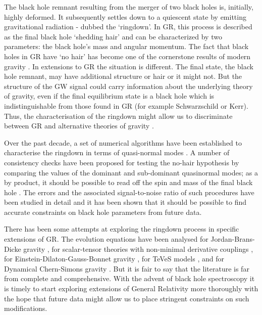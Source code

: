 \documentclass[10pt,twocolumn,preprintnumbers,amsmath,amssymb,nofootinbib
,superscriptaddress]{revtex4-1}
\begin{document}
The black hole remnant resulting from the merger of two black holes is, initially, highly deformed. It subsequently settles down to a quiescent state by emitting gravitational radiation - dubbed the `ringdown'. In GR, this process is described as the final black hole `shedding hair' and can be characterized by two parameters: the black hole's mass and angular momentum. The fact that black holes in GR have `no hair' has become one of the cornerstone results of modern gravity \cite{Dreyer:2003bv,Gossan:2011ha, Kamaretsos:2011um,Meidam:2014jpa, Nakano:2015uja, Cardoso:2016ryw, Thrane:2017lqn,  Glampedakis:2017dvb}. In extensions to GR the situation is different. The final state, the black hole remnant, may have additional structure or hair or it might not. But the structure of the GW signal could carry information about the underlying theory of gravity, even if the final equilibrium state is a black hole which is indistinguishable from those found in GR (for example Schwarzschild or Kerr). Thus, the characterisation of the ringdown might allow us to discriminate between GR and alternative theories of gravity \cite{Barausse:2008xv}.

Over the past decade, a set of numerical algorithms have been established to characterise the ringdown in terms of quasi-normal modes \cite{Berti:2009kk}.
A number of consistency checks have been proposed for testing the no-hair hypothesis by comparing the values of the dominant and sub-dominant quasinormal modes; as a by product, it should be possible to read off the spin and mass of the final black hole \cite{Berti:2005ys}. The errors and the associated signal-to-noise ratio of such procedures have been studied in detail \cite{Berti:2007zu,Yang:2017zxs,Baibhav:2017jhs} and it has been shown that it should be possible to find accurate constraints on black hole parameters from future data. 

There has been some attempts at exploring the ringdown process in specific extensions of GR. The evolution equations have been analysed for Jordan-Brans-Dicke gravity \cite{Harada:1997mr, PhysRevD.34.333}, for scalar-tensor theories with non-minimal derivative couplings \cite{Dong:2017toi}, for Einstein-Dilaton-Gauss-Bonnet gravity \cite{Blazquez-Salcedo:2016enn}, for TeVeS models \cite{Lasky:2010bd}, and for Dynamical Chern-Simons gravity \cite{Cardoso:2009pk,Molina:2010fb}. But it is fair to say that the literature is far from complete and comprehensive. With the advent of black hole spectroscopy it is timely to start exploring extensions of General Relativity more thoroughly with the hope that future data might allow us to place stringent constraints on such modifications. 
\end{document}

